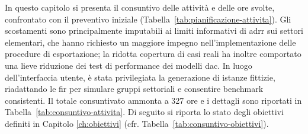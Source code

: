 In questo capitolo si presenta il consuntivo delle attività e delle ore svolte, confrontato con il preventivo iniziale (Tabella~\ref{tab:pianificazione-attivita}). Gli scostamenti sono principalmente imputabili ai limiti informativi di \gls{adrr} sui settori elementari, che hanno richiesto un maggiore impegno nell’implementazione delle procedure di esportazione; la ridotta copertura di casi reali ha inoltre comportato una lieve riduzione dei test di performance dei modelli \gls{dac}. In luogo dell’interfaccia utente, è stata privilegiata la generazione di istanze fittizie, riadattando le \gls{fir} per simulare gruppi settoriali e consentire benchmark consistenti. Il totale consuntivato ammonta a 327 ore e i dettagli sono riportati in Tabella~\ref{tab:consuntivo-attivita}.
Di seguito si riporta lo stato degli obiettivi definiti in Capitolo \ref{ch:obiettivi} (cfr. Tabella~\ref{tab:consuntivo-obiettivi}).  

